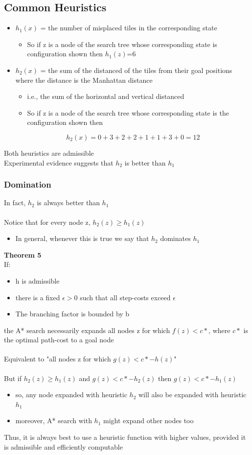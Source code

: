 \documentclass{article}[18pt]
\begin{document}
\subsection{Common Heuristics}
\begin{itemize}
	\item $h_1(x)$ = the number of misplaced tiles in the corresponding state
	\begin{itemize}
		\item So if z is a node of the search tree whose corresponding state is configuration shown then $h_1(z)$=6
	\end{itemize}
	\item $h_2(x)$ = the sum of the distanced of the tiles from their goal positions where the distance is the Manhattan distance
	\begin{itemize}
		\item i.e., the sum of the horizontal and vertical distanced
		\item So if z is a node of the search tree whose corresponding state is the configuration shown then
	\end{itemize}
	$$h_2(x)=0+3+2+2+1+1+3+0=12$$
\end{itemize}
Both heuristics are admissible\\
Experimental evidence suggests that $h_2$ is better than $h_1$
\subsubsection{Domination}
In fact, $h_2$ is always better than $h_1$\\
\\
Notice that for every node z, $h_2(z)\geqslant h_1(z)$
\begin{itemize}
	\item In general, whenever this is true we say that $h_2$ dominates $h_1$
\end{itemize}
\textbf{Theorem 5}\\
If:
\begin{itemize}
	\item h is admissible
	\item there is a fixed $\epsilon>0$ such that all step-costs exceed $\epsilon$
	\item The branching factor is bounded by b
\end{itemize}
the  A* search necessarily expands all nodes z for which $f(z)<c*$, where $c*$ is the optimal path-cost to a goal node\\
\\
Equivalent to "all nodes z for which $g(z)<c*-h(z)$"\\
\\
But if $h_2(z)\geqslant h_1(z)$ and $g(z)<c*-h_2(z)$ then $g(z)<c*-h_1(z)$
\begin{itemize}
	\item so, any node expanded with heuristic $h_2$ will also be expanded with heuristic $h_1$
	\item moreover, A* search with $h_1$ might expand other nodes too
\end{itemize}
Thus, it is always best to use a heuristic function with higher values, provided it is admissible and efficiently computable
\end{document}
